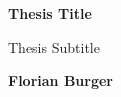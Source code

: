 \begin{titlepage}
    \begin{center}

        \vfill %

        \Huge
        \textbf{Thesis Title}

        \vspace{0.5cm} %

        \LARGE
        Thesis Subtitle

        \vspace{1.5cm} %

        \textbf{Florian Burger}
    \end{center}
\end{titlepage}